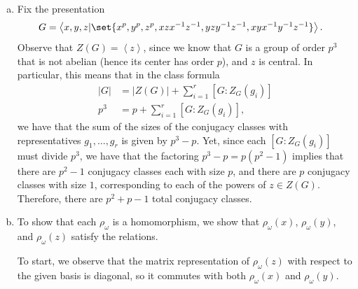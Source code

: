 \documentclass[10pt]{mypackage}
\begin{document}
\begin{solution}\hfill
  \begin{enumerate}[(a)]
    \item Fix the presentation
      \begin{align*}
        G &= \left\langle x,y,z|\set{x^{p},y^{p},z^{p},xzx^{-1}z^{-1},yzy^{-1}z^{-1},xyx^{-1}y^{-1}z^{-1}} \right\rangle.
      \end{align*}
      Observe that $Z(G) = \left\langle z \right\rangle$, since we know that $G$ is a group of order $p^{3}$ that is not abelian (hence its center has order $p$), and $z$ is central. In particular, this means that in the class formula
      \begin{align*}
        \left\vert G \right\vert &= \left\vert Z(G) \right\vert + \sum_{i=1}^{r} \left[ G:Z_G\left(g_i\right) \right]\\
        p^3 &= p + \sum_{i=1}^{r} \left[ G:Z_G\left( g_i \right) \right],
      \end{align*}
      we have that the sum of the sizes of the conjugacy classes with representatives $g_1,\dots,g_r$ is given by $p^3 - p$. Yet, since each $\left[ G:Z_G\left( g_i \right) \right]$ must divide $p^3$, we have that the factoring $p^3 - p = p\left( p^2 - 1 \right)$ implies that there are $p^2 - 1$ conjugacy classes each with size $p$, and there are $p$ conjugacy classes with size $1$, corresponding to each of the powers of $z\in Z(G)$. Therefore, there are $p^2 + p - 1$ total conjugacy classes.
    \item To show that each $\rho_{\omega}$ is a homomorphism, we show that $\rho_{\omega}(x)$, $\rho_{\omega}(y)$, and $\rho_{\omega}(z)$ satisfy the relations.

      To start, we observe that the matrix representation of $\rho_{\omega}(z)$ with respect to the given basis is diagonal, so it commutes with both $\rho_{\omega}(x)$ and $\rho_{\omega}(y)$.


\end{enumerate}
\end{solution}
\end{document}
